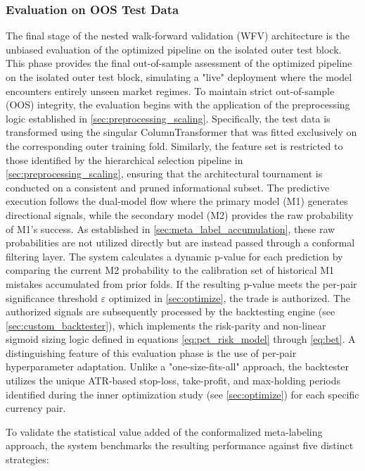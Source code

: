 \documentclass[12pt, a4paper]{article}
\begin{document}
\subsubsection{Evaluation on OOS Test Data}\label{sec:oos_evaluation}

The final stage of the nested walk-forward validation (WFV) architecture is the unbiased evaluation of the optimized pipeline on the isolated outer test block. 
This phase provides the final out-of-sample assessment of the optimized pipeline on the isolated outer test block, simulating a "live" deployment where the model encounters entirely unseen market regimes.
To maintain strict out-of-sample (OOS) integrity, the evaluation begins with the application of the preprocessing logic established in \ref{sec:preprocessing_scaling}. 
Specifically, the test data is transformed using the singular ColumnTransformer that was fitted exclusively on the corresponding outer training fold. 
Similarly, the feature set is restricted to those identified by the hierarchical selection pipeline in \ref{sec:preprocessing_scaling}, ensuring that the architectural tournament 
is conducted on a consistent and pruned informational subset.
The predictive execution follows the dual-model flow where the primary model (M1) generates directional signals, while the secondary model (M2) provides the raw probability of M1's success. 
As established in \ref{sec:meta_label_accumulation}, these raw probabilities are not utilized directly but are instead passed through a conformal filtering layer. 
The system calculates a dynamic p-value for each prediction by comparing the current M2 probability to the calibration set of historical M1 mistakes accumulated from prior folds. 
If the resulting p-value meets the per-pair significance threshold \( \varepsilon \) optimized in \ref{sec:optimize}, the trade is authorized.
The authorized signals are subsequently processed by the backtesting engine (see \ref{sec:custom_backtester}), which implements the risk-parity and non-linear sigmoid sizing logic 
defined in equations \ref{eq:pct_risk_model} through \ref{eq:bet}. A distinguishing feature of this evaluation phase is the use of per-pair hyperparameter adaptation. 
Unlike a "one-size-fits-all" approach, the backtester utilizes the unique ATR-based stop-loss, take-profit, and max-holding periods identified during the inner optimization study 
(see \ref{sec:optimize}) for each specific currency pair.

\medskip

To validate the statistical value added of the conformalized meta-labeling approach, the system benchmarks the resulting performance against five distinct strategies:
\end{document}
